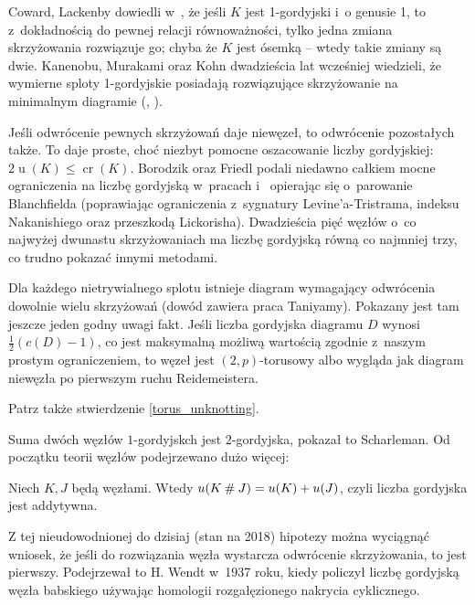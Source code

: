 Coward, Lackenby dowiedli w~\cite{coward11}, że jeśli $K$ jest 1-gordyjski i~o genusie 1, to z~dokładnością do pewnej relacji równoważności, tylko jedna zmiana skrzyżowania rozwiązuje go; chyba że $K$ jest ósemką -- wtedy takie zmiany są dwie.
Kanenobu, Murakami oraz Kohn dwadzieścia lat wcześniej wiedzieli, że wymierne sploty 1-gordyjskie posiadają rozwiązujące skrzyżowanie na minimalnym diagramie (\cite{kanenobu86}, \cite{kohn91}).

Jeśli odwrócenie pewnych skrzyżowań daje niewęzeł, to odwrócenie pozostałych także.
To daje proste, choć niezbyt pomocne oszacowanie liczby gordyjskiej: $2 \operatorname{u} (K) \le \operatorname{cr} (K)$.
Borodzik oraz Friedl podali niedawno całkiem mocne ograniczenia na liczbę gordyjską w~pracach \cite{borodzik14} i~\cite{borodzik15} opierając się o~parowanie Blanchfielda
(poprawiając ograniczenia z~sygnatury Levine'a-Tristrama, indeksu Nakanishiego oraz przeszkodą Lickorisha).
Dwadzieścia pięć węzłów o~co najwyżej dwunastu skrzyżowaniach ma liczbę gordyjską równą co najmniej trzy, co trudno pokazać innymi metodami.

Dla każdego nietrywialnego splotu istnieje diagram wymagający odwrócenia dowolnie wielu skrzyżowań (dowód zawiera praca \cite{taniyama09} Taniyamy).
Pokazany jest tam jeszcze jeden godny uwagi fakt.
Jeśli liczba gordyjska diagramu $D$ wynosi $\frac 12 (c(D) - 1)$,
co jest maksymalną możliwą wartością zgodnie z~naszym prostym ograniczeniem,
to węzeł jest $(2,p)$-torusowy albo wygląda jak diagram niewęzła po pierwszym ruchu Reidemeistera.

Patrz także stwierdzenie \ref{torus_unknotting}.

Suma dwóch węzłów $1$-gordyjskch jest $2$-gordyjska, pokazał to Scharleman.
Od początku teorii węzłów podejrzewano dużo więcej:

\begin{conjecture}
    Niech $K, J$ będą węzłami.
    Wtedy $u(K \mathbin{\#} J) = u(K) + u(J)$, czyli liczba gordyjska jest addytywna.
\end{conjecture}

Z tej nieudowodnionej do dzisiaj (stan na 2018) hipotezy można wyciągnąć wniosek,
że jeśli do rozwiązania węzła wystarcza odwrócenie skrzyżowania, to jest pierwszy.
Podejrzewał to H. Wendt w~1937 roku,
kiedy policzył liczbę gordyjską węzła babskiego używając homologii rozgałęzionego nakrycia cyklicznego.

